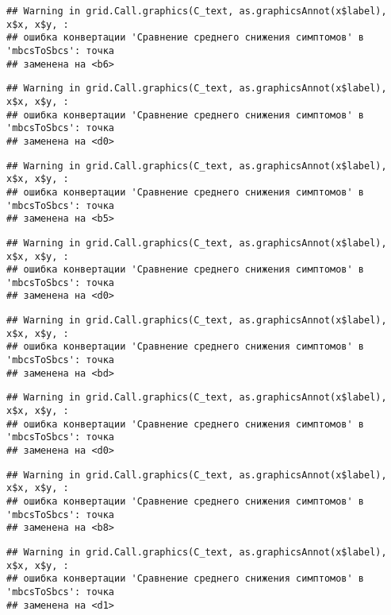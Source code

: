 \documentclass[
]{article}
\begin{document}
\begin{verbatim}
## Warning in grid.Call.graphics(C_text, as.graphicsAnnot(x$label), x$x, x$y, :
## ошибка конвертации 'Сравнение среднего снижения симптомов' в 'mbcsToSbcs': точка
## заменена на <b6>
\end{verbatim}

\begin{verbatim}
## Warning in grid.Call.graphics(C_text, as.graphicsAnnot(x$label), x$x, x$y, :
## ошибка конвертации 'Сравнение среднего снижения симптомов' в 'mbcsToSbcs': точка
## заменена на <d0>
\end{verbatim}

\begin{verbatim}
## Warning in grid.Call.graphics(C_text, as.graphicsAnnot(x$label), x$x, x$y, :
## ошибка конвертации 'Сравнение среднего снижения симптомов' в 'mbcsToSbcs': точка
## заменена на <b5>
\end{verbatim}

\begin{verbatim}
## Warning in grid.Call.graphics(C_text, as.graphicsAnnot(x$label), x$x, x$y, :
## ошибка конвертации 'Сравнение среднего снижения симптомов' в 'mbcsToSbcs': точка
## заменена на <d0>
\end{verbatim}

\begin{verbatim}
## Warning in grid.Call.graphics(C_text, as.graphicsAnnot(x$label), x$x, x$y, :
## ошибка конвертации 'Сравнение среднего снижения симптомов' в 'mbcsToSbcs': точка
## заменена на <bd>
\end{verbatim}

\begin{verbatim}
## Warning in grid.Call.graphics(C_text, as.graphicsAnnot(x$label), x$x, x$y, :
## ошибка конвертации 'Сравнение среднего снижения симптомов' в 'mbcsToSbcs': точка
## заменена на <d0>
\end{verbatim}

\begin{verbatim}
## Warning in grid.Call.graphics(C_text, as.graphicsAnnot(x$label), x$x, x$y, :
## ошибка конвертации 'Сравнение среднего снижения симптомов' в 'mbcsToSbcs': точка
## заменена на <b8>
\end{verbatim}

\begin{verbatim}
## Warning in grid.Call.graphics(C_text, as.graphicsAnnot(x$label), x$x, x$y, :
## ошибка конвертации 'Сравнение среднего снижения симптомов' в 'mbcsToSbcs': точка
## заменена на <d1>
\end{verbatim}
\end{document}
